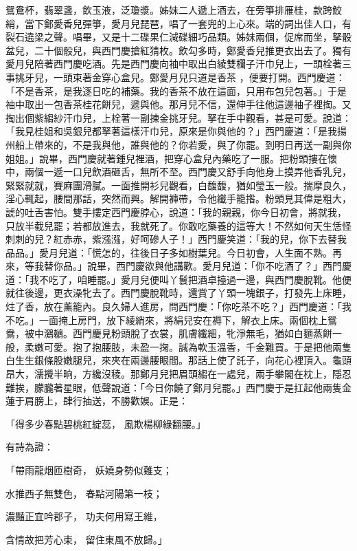 \begin{showcontents}{}
鴛鴦杯，翡翠盞，飲玉液，泛瓊漿。姊妹二人遞上酒去，在旁箏排雁桂，款跨鮫綃，當下鄭愛香兒彈箏，愛月兒琵琶，唱了一套兜的上心來。端的詞出佳人口，有裂石遶梁之聲。唱畢，又是十二碟果仁減碟細巧品類。姊妹兩個，促席而坐，拏骰盆兒，二十個骰兒，與西門慶搶紅猜枚。飲勾多時，鄭愛香兒推更衣出去了。獨有愛月兒陪著西門慶吃酒。先是西門慶向袖中取出白綾雙欄子汗巾兒上，一頭栓著三事挑牙兒，一頭束著金穿心盒兒。鄭愛月兒只道是香茶 ，便要打開。西門慶道：「不是香茶，是我逐日吃的補藥。我的香茶不放在這面，只用布包兒包著。」于是袖中取出一包香茶桂花餅兒，遞與他。那月兒不信，還伸手往他這邊袖子裡掏。又掏出個紫縐紗汗巾兒，上栓著一副揀金挑牙兒。拏在手中觀看，甚是可愛。說道：「我見桂姐和吳銀兒都拏著這樣汗巾兒，原來是你與他的？」西門慶道：「是我揚州船上帶來的，不是我與他，誰與他的？你若愛，與了你罷。到明日再送一副與你姐姐。」說畢，西門慶就著鍾兒裡酒，把穿心盒兒內藥吃了一服。把粉頭摟在懷中，兩個一遞一口兒飲酒砸舌，無所不至。西門慶又舒手向他身上摸弄他香乳兒，緊緊就就，賽麻團滑膩。一面推開衫兒觀看，白馥馥，猶如瑩玉一般。揣摩良久，淫心輒起，腰間那話，突然而興。解開褲帶，令他纖手籠揝。粉頭見其偉是粗大，諕的吐舌害怕。雙手摟定西門慶脖心，說道：「我的親親，你今日初會，將就我，只放半截兒罷；若都放進去，我就死了。你敢吃藥養的這等大！不然如何天生恁怪刺刺的兒？紅赤赤，紫漒漒，好呵磣人子！」西門慶笑道：「我的兒，你下去替我品品。」愛月兒道：「慌怎的，往後日子多如樹葉兒。今日初會，人生面不熟。再來，等我替你品。」說畢，西門慶欲與他講歡。愛月兒道：「你不吃酒了？」西門慶道：「我不吃了，咱睡罷。」愛月兒便叫丫鬟把酒卓擡過一邊，與西門慶脫靴。他便就往後邊，更衣澡牝去了。西門慶脫靴時，還賞了丫頭一塊銀子，打發先上床睡，炷了香，放在薰籠內。良久婦人進房，問西門慶：「你吃茶不吃？」西門慶道：「我不吃。」一面掩上房門，放下綾綃來，將絹兒安在褥下，解衣上床。兩個枕上鴛鴦，被中鸂鶒。西門慶見粉頭脫了衣裳，肌膚纖細，牝淨無毛，猶如白麵蒸餅一般，柔嫩可愛。抱了抱腰肢，未盈一掬。誠為軟玉溫香，千金難買。于是把他兩隻白生生銀條股嫩腿兒，來夾在兩邊腰眼間。那話上使了託子，向花心裡頂入。龜頭昂大，濡攪半晌，方纔沒稜。那鄭月兒把眉頭縐在一處兒，兩手攀閣在枕上，隱忍難挨，朦朧著星眼，低聲說道：「今日你饒了鄭月兒罷。」西門慶于是扛起他兩隻金蓮于肩膀上，肆行抽送，不勝歡娛。正是：

「得多少春點碧桃紅綻蕊，  風欺楊柳綠翻腰。」

有詩為證：

「帶雨龍烟匝樹奇，  妖嬈身勢似難支；

水推西子無雙色，  春點河陽第一枝；

濃豔正宜吟郡子，  功夫何用寫王維，

含情故把芳心束，  留住東風不放歸。」


\end{showcontents}
